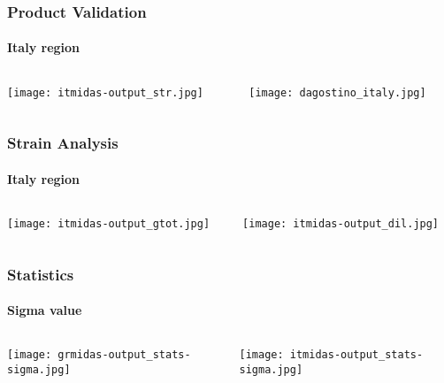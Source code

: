 \begin{frame}
  \frametitle{Product Validation}
  \framesubtitle{Italy region}
  \label{ch4:}

  \begin{columns}
    \begin{column}{0.4\textwidth}
      \begin{center}
        \texttt{[image: itmidas-output\_str.jpg]}
      \end{center}
    \end{column}
    \begin{column}{0.58\textwidth}
      \begin{center}
        \citet{DAgostino2014}
        \texttt{[image: dagostino\_italy.jpg]}     
      \end{center}
    \end{column}
  \end{columns}

\end{frame}
\note{}

\begin{frame}
  \frametitle{Strain Analysis}
  \framesubtitle{Italy region}
  \label{ch4:}

  \begin{columns}
    \begin{column}{0.5\textwidth}
      \begin{center}
        \texttt{[image: itmidas-output\_gtot.jpg]}   
      \end{center}
    \end{column}
    \begin{column}{0.5\textwidth}
      \begin{center}
        \texttt{[image: itmidas-output\_dil.jpg]}     
      \end{center}
    \end{column}
  \end{columns}

\end{frame}
\note{}

\begin{frame}
  \frametitle{Statistics}
  \framesubtitle{Sigma value}
  \label{ch4:}
   
  \begin{columns}
    \begin{column}{0.5\textwidth}
      \begin{center}
        \texttt{[image: grmidas-output\_stats-sigma.jpg]}   
      \end{center}
    \end{column}
    \begin{column}{0.5\textwidth}
      \begin{center}
        \texttt{[image: itmidas-output\_stats-sigma.jpg]}     
      \end{center}
    \end{column}
  \end{columns}

\end{frame}
\note{}

